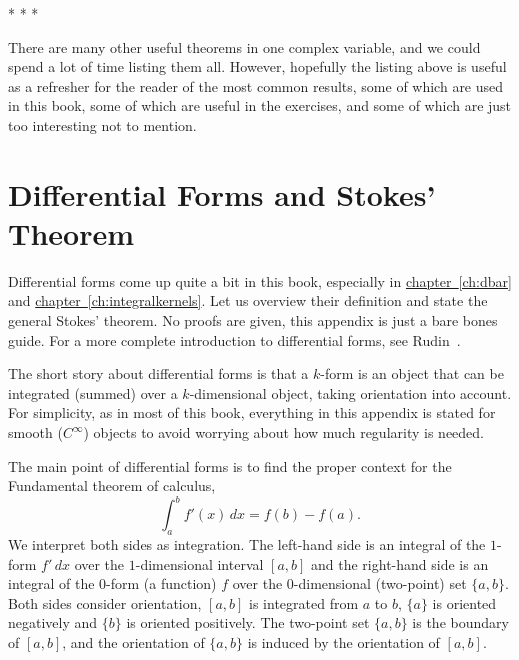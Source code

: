 \documentclass[12pt,openany]{book}
\theoremstyle{plain}
\theoremstyle{remark}
\theoremstyle{definition}
\theoremstyle{exercise}
\theoremstyle{example}
\newcommand{\chapterref}[1]{\hyperref[#1]{chapter~\ref*{#1}}}
\begin{document}
\begin{center}
* * *
\end{center}

There are many other useful theorems in one complex variable, and we could
spend a lot of time listing them all.
However, hopefully the listing above is useful
as a refresher for the reader of the most common results, some of which are
used in this book, some of which are useful in the exercises, and some of
which are just too interesting not to mention.



\chapter{Differential Forms and Stokes' Theorem} \label{ap:diffforms}


Differential forms come up quite a bit in this book, especially
in \chapterref{ch:dbar} and \chapterref{ch:integralkernels}.
Let us overview their definition
and state the general Stokes' theorem.  No proofs are given, this appendix
is just a bare bones guide.
For a more complete introduction to differential forms,
see Rudin~\cite{Rudin:principles}.

The short story about differential forms is that a $k$-form is an object
that can be integrated (summed) over a $k$-dimensional object,
taking orientation into account.
For simplicity, as in most of this book,
everything in this appendix is stated for smooth
($C^\infty$) objects to avoid worrying about how much regularity is needed.

The main point of differential forms is to find the proper context for the
Fundamental theorem of calculus,
\begin{equation*}
\int_a^b f'(x) \, dx = f(b)-f(a) .
\end{equation*}
We interpret both sides as integration.  The left-hand side is an integral
of the $1$-form $f'\, dx$ over the $1$-dimensional interval $[a,b]$
and the right-hand side is an integral of the $0$-form (a function)
$f$ over the $0$-dimensional (two-point) set $\{ a, b \}$.  Both sides
consider orientation, $[a,b]$ is integrated from $a$ to $b$,
$\{a\}$ is oriented negatively and
$\{b\}$ is oriented positively.  The two-point set
$\{a,b\}$ is the boundary of $[a,b]$, and the orientation of $\{ a,b \}$
is induced by the orientation of $[a,b]$.
\end{document}
